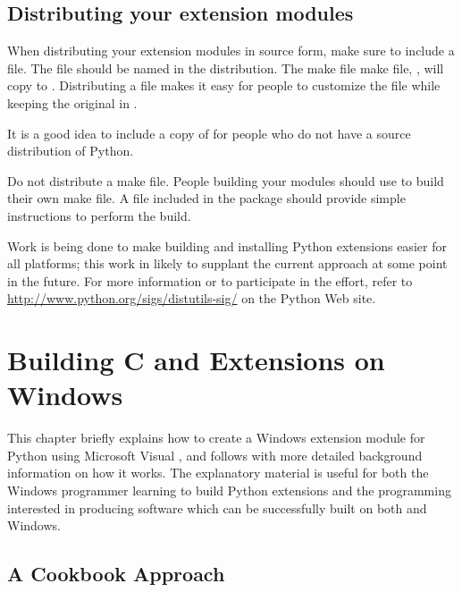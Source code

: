 \documentclass{manual}
\begin{document}
\section{Distributing your extension modules
         \label{distributing}}

When distributing your extension modules in source form, make sure to
include a  file.  The  file should be named
 in the distribution.  The make file make file,
, will copy  to .
Distributing a  file makes it easy for people to
customize the  file while keeping the original in
.

It is a good idea to include a copy of  for
people who do not have a source distribution of Python.

Do not distribute a make file.  People building your modules
should use  to build their own make file.  A
 file included in the package should provide simple
instructions to perform the build.

Work is being done to make building and installing Python extensions
easier for all platforms; this work in likely to supplant the current
approach at some point in the future.  For more information or to
participate in the effort, refer to
\url{http://www.python.org/sigs/distutils-sig/} on the Python Web
site.


\chapter{Building C and \Cpp{} Extensions on Windows
         \label{building-on-windows}}


This chapter briefly explains how to create a Windows extension module
for Python using Microsoft Visual \Cpp{}, and follows with more
detailed background information on how it works.  The explanatory
material is useful for both the Windows programmer learning to build
Python extensions and the \UNIX{} programming interested in producing
software which can be successfully built on both \UNIX{} and Windows.


\section{A Cookbook Approach \label{win-cookbook}}

\end{document}
